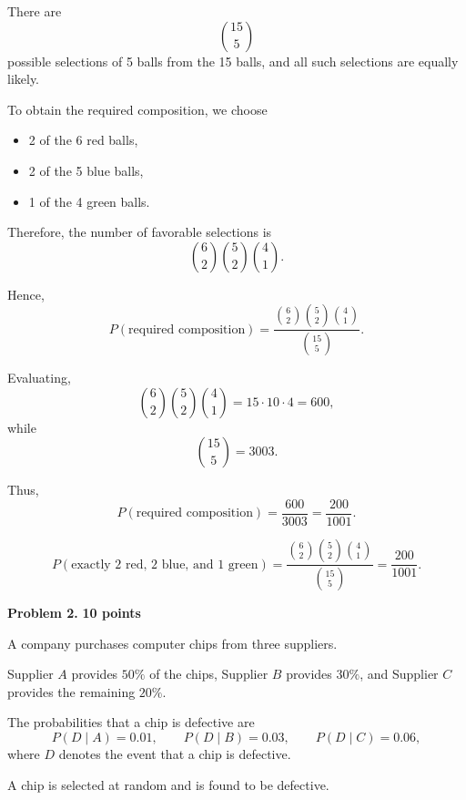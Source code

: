 \documentclass[11pt]{article}
\begin{document}
\begin{solutionbox}

There are
\[
\binom{15}{5}
\]
possible selections of 5 balls from the 15 balls, and all such selections
are equally likely.

To obtain the required composition, we choose

\begin{itemize}[leftmargin=*]
    \item 2 of the 6 red balls,
    \item 2 of the 5 blue balls,
    \item 1 of the 4 green balls.
\end{itemize}

Therefore, the number of favorable selections is
\[
\binom{6}{2}\binom{5}{2}\binom{4}{1}.
\]

Hence,
\[
P(\text{required composition})
=
\frac{
\binom{6}{2}\binom{5}{2}\binom{4}{1}
}{
\binom{15}{5}
}.
\]

Evaluating,
\[
\binom{6}{2}\binom{5}{2}\binom{4}{1}
=
15\cdot 10\cdot 4
=
600,
\]
while
\[
\binom{15}{5}=3003.
\]

Thus,
\[
P(\text{required composition})
=
\frac{600}{3003}
=
\frac{200}{1001}.
\]

\begin{finalanswerbox}
\[
P(\text{exactly 2 red, 2 blue, and 1 green})
=
\frac{\binom62\binom52\binom41}{\binom{15}{5}}
=
\frac{200}{1001}.
\]
\end{finalanswerbox}

\end{solutionbox}


\newpage


\begin{problemheader}
\textbf{Problem 2.} \hfill \textbf{10 points}
\end{problemheader}

A company purchases computer chips from three suppliers.

Supplier $A$ provides $50\%$ of the chips, Supplier $B$ provides $30\%$,
and Supplier $C$ provides the remaining $20\%$.

The probabilities that a chip is defective are
\[
P(D\mid A)=0.01,\qquad
P(D\mid B)=0.03,\qquad
P(D\mid C)=0.06,
\]
where $D$ denotes the event that a chip is defective.

A chip is selected at random and is found to be defective.
\end{document}
